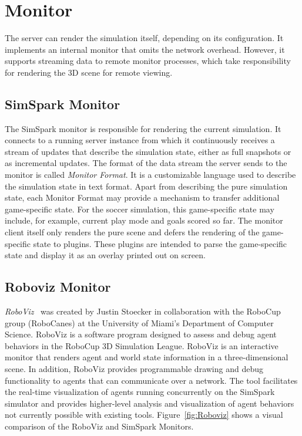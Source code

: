 \section{Monitor}

The server can render the simulation itself, depending on its configuration. It implements an internal monitor that omits the network overhead. However, it supports streaming data to remote monitor processes, which take responsibility for rendering the 3D scene for remote viewing.


\subsection{SimSpark Monitor}
The SimSpark monitor is responsible for rendering the current simulation. It connects to a running server instance from which it continuously receives a stream of updates that describe the simulation state, either as full snapshots or as incremental updates.
The format of the data stream the server sends to the monitor is called \textit{Monitor Format}. It is a customizable language used to describe the simulation state in text format.
Apart from describing the pure simulation state, each Monitor Format may provide a mechanism to transfer additional game-specific state. For the soccer simulation, this game-specific state may include, for example, current play mode and goals scored so far. The monitor client itself only renders the pure scene and defers the rendering of the game-specific state to plugins. These plugins are intended to parse the game-specific state and display it as an overlay printed out on screen.



\subsection{Roboviz Monitor}
\textit{RoboViz}~\cite{Roboviz} was created by Justin Stoecker in collaboration with the RoboCup group (RoboCanes) at the University of Miami's Department of Computer Science.
RoboViz is a software program designed to assess and debug agent behaviors in the RoboCup 3D Simulation League. RoboViz is an interactive monitor that renders agent and world state information in a three-dimensional scene. In addition, RoboViz provides programmable drawing and debug functionality to agents that can communicate over a network. The tool facilitates the real-time visualization of agents running concurrently on the SimSpark simulator and provides higher-level analysis and visualization of agent behaviors not currently possible with existing tools. Figure~\ref{fig:Roboviz} shows a visual comparison of the RoboViz and SimSpark Monitors.

